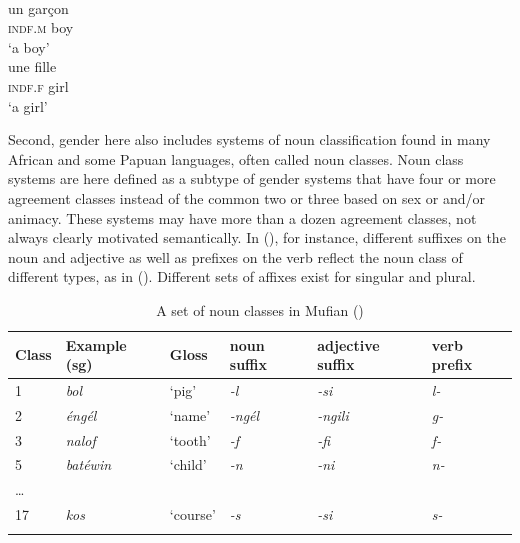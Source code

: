\documentclass[output=collectionpaper]{langsci/langscibook}
\begin{document}
\ea
\label{ex:Sinne:3}
\\
\begin{xlist}
\ex
\gll un garçon\\
\textsc{indf.m} boy\\
\glt `a boy'\\
\ex
\gll une fille\\
\textsc{indf.f} girl \\
\glt `a girl'
\end{xlist}
\z

Second, gender here also includes systems of noun classification found in many African and some Papuan languages, often called noun classes. Noun class systems are here defined as a subtype of gender systems that have four or more agreement classes instead of the common two or three based on sex or and/or animacy. These systems may have more than a dozen agreement classes, not always clearly motivated semantically. In  (), for instance, different suffixes on the noun and adjective as well as prefixes on the verb reflect the noun class of different types, as in  (\citealt{Alungum1978}). Different sets of affixes exist for singular and plural.

\begin{table}[htb]
\begin{tabularx}{\textwidth}{lXXXXX}
\lsptoprule
Class & Example (sg) & Gloss & noun suffix & adjective suffix & verb prefix\\
\midrule
1 & \textit{bol} & `pig' & \textit{{}-l} & \textit{{}-si} & \textit{l-}\\
2 & \textit{éngél} & `name' & \textit{{}-ngél} & \textit{{}-ngili} & \textit{g-}\\
3 & \textit{nalof} & `tooth' & \textit{{}-f} & \textit{{}-fi} & \textit{f-}\\
5 & \textit{batéwin} & `child' & \textit{{}-n} & \textit{{}-ni} & \textit{n-}\\
… &  &  &  &  & \\
17 & \textit{kos} & `course' & \textit{{}-s} & \textit{{}-si} & \textit{s-}\\
\lspbottomrule
\end{tabularx}
\caption{A set of noun classes in {Mufian} (\citealt[93]{Alungum1978})}
\label{tab:Sinne:1}
\end{table}
\end{document}
